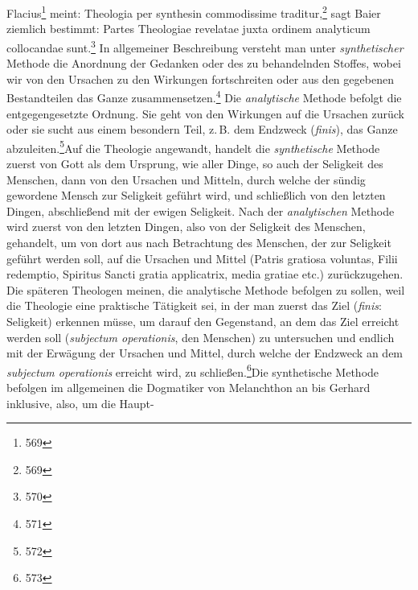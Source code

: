 Flacius\footnote{569} meint: Theologia per synthesin commodissime traditur,\footnote{569} sagt Baier ziemlich bestimmt: Partes Theologiae revelatae juxta ordinem analyticum collocandae sunt.\footnote{570} In allgemeiner Beschreibung versteht man unter \emph{synthetischer} Methode die Anordnung der Gedanken oder des zu behandelnden Stoffes, wobei wir von den Ursachen zu den Wirkungen fortschreiten oder aus den gegebenen Bestandteilen das Ganze zusammensetzen.\footnote{571} Die \emph{analytische} Methode befolgt die entgegengesetzte Ordnung. Sie geht von den Wirkungen auf die Ursachen zurück oder sie sucht aus einem besondern Teil, z.\,B. dem Endzweck (\emph{finis}), das Ganze abzuleiten.\footnote{572}Auf die Theologie angewandt, handelt die \emph{synthetische} Methode zuerst von Gott als dem Ursprung, wie aller Dinge, so auch der Seligkeit des Menschen, dann von den Ursachen und Mitteln, durch welche der sündig gewordene Mensch zur Seligkeit geführt wird, und schließlich von den letzten Dingen, abschließend mit der ewigen Seligkeit. Nach der \emph{analytischen} Methode wird zuerst von den letzten Dingen, also von der Seligkeit des Menschen, gehandelt, um von dort aus nach Betrachtung des Menschen, der zur Seligkeit geführt werden soll, auf die Ursachen und Mittel (Patris gratiosa voluntas, Filii redemptio, Spiritus Sancti gratia applicatrix, media gratiae etc.) zurückzugehen. Die späteren Theologen meinen, die analytische Methode befolgen zu sollen, weil die Theologie eine praktische Tätigkeit sei, in der man zuerst das Ziel (\emph{finis}: Seligkeit) erkennen müsse, um darauf den Gegenstand, an dem das Ziel erreicht werden soll (\emph{subjectum operationis}, den Menschen) zu untersuchen und endlich mit der Erwägung der Ursachen und Mittel, durch welche der Endzweck an dem \emph{subjectum operationis} erreicht wird, zu schließen.\footnote{573}Die synthetische Methode befolgen im allgemeinen die Dogmatiker von Melanchthon an bis Gerhard inklusive, also, um die Haupt-